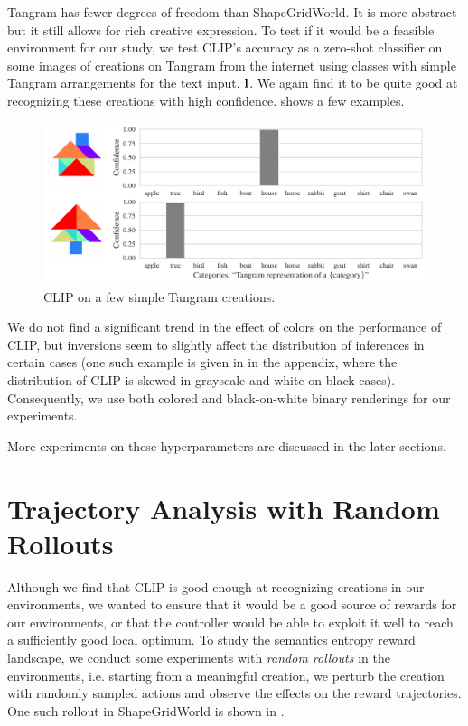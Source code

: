 Tangram has fewer degrees of freedom than ShapeGridWorld.
It is more abstract but it still allows for rich creative expression.
To test if it would be a feasible environment for our study, we test CLIP's accuracy as a zero-shot classifier on some images of creations on Tangram from the internet using classes with simple Tangram arrangements for the text input, \(\mathbf{l}\).
We again find it to be quite good at recognizing these creations with high confidence.
 shows a few examples.
\begin{figure}[h]
    \centering
    \includegraphics[width=\textwidth]{images/tangram_comparison_10.pdf}
    \caption{CLIP on a few simple Tangram creations.}
    \label{fig:clip-tangram}
\end{figure}

We do not find a significant trend in the effect of colors on the performance of CLIP, but inversions seem to slightly affect the distribution of inferences in certain cases
(one such example is given in  in the appendix, where the distribution of CLIP is skewed in grayscale and white-on-black cases).
Consequently, we use both colored and black-on-white binary renderings for our experiments.

More experiments on these hyperparameters are discussed in the later sections.


\section{Trajectory Analysis with Random Rollouts}
\label{sec:clip-problems}
Although we find that CLIP is good enough at recognizing creations in our environments, we wanted to ensure that it would be a good source of rewards for our environments, or that the controller would be able to exploit it well to reach a sufficiently good local optimum.
To study the semantics entropy reward landscape, we conduct some experiments with \emph{random rollouts} in the environments, i.e. starting from a meaningful creation, we perturb the creation with randomly sampled actions and observe the effects on the reward trajectories.
One such rollout in ShapeGridWorld is shown in .


